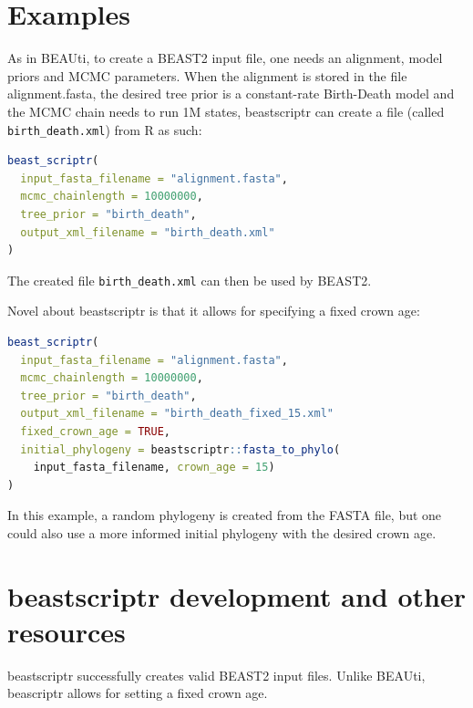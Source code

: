 \documentclass{article}
\begin{document}
\section{Examples}


As in BEAUti, to create a BEAST2 input file, 
one needs an alignment, model priors and MCMC parameters.
When the alignment is stored in the file alignment.fasta,
the desired tree prior is a constant-rate Birth-Death 
model \cite{nee1994reconstructed} and the MCMC chain needs to run 1M 
states, beastscriptr can create a file 
(called \verb;birth_death.xml;) from R 
as such:

\begin{lstlisting}[language=R]
beast_scriptr(
  input_fasta_filename = "alignment.fasta",
  mcmc_chainlength = 10000000,
  tree_prior = "birth_death",
  output_xml_filename = "birth_death.xml"
)
\end{lstlisting}

The created file \verb;birth_death.xml; can then be used by BEAST2.

Novel about beastscriptr is that it allows for specifying a fixed crown age:

\begin{lstlisting}[language=R]
beast_scriptr(
  input_fasta_filename = "alignment.fasta",
  mcmc_chainlength = 10000000,
  tree_prior = "birth_death",
  output_xml_filename = "birth_death_fixed_15.xml"
  fixed_crown_age = TRUE,
  initial_phylogeny = beastscriptr::fasta_to_phylo(
    input_fasta_filename, crown_age = 15)
)
\end{lstlisting}

In this example, a random phylogeny is created from the FASTA file, but
one could also use a more informed initial phylogeny with the desired crown age. 

\section{beastscriptr development and other resources}

beastscriptr successfully creates valid BEAST2 input files. Unlike BEAUti,
beascriptr allows for setting a fixed crown age.
\end{document}
